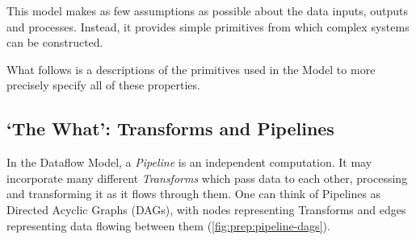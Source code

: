 This model makes as few assumptions as possible about the data inputs, outputs and processes. 
Instead, it provides simple primitives from which complex systems can be constructed.

What follows is a descriptions of the primitives used in the Model to more precisely specify all of these properties.

\subsection{`The What': Transforms and Pipelines}\label{sec:prep:dataflow:what}

In the Dataflow Model, a \emph{Pipeline} is an independent computation.
It may incorporate many different \emph{Transforms} which pass data to each other, processing and transforming it as it flows through them.
One can think of Pipelines as Directed Acyclic Graphs (DAGs), with nodes representing Transforms and edges representing data flowing between them (\cref{fig:prep:pipeline-dags}).

